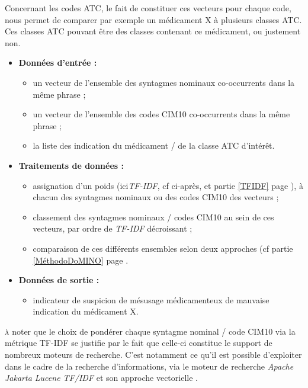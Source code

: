 \documentclass[a4paper, 12pt, openany, oneside, abstract=on]{article} %
\begin{document}
Concernant les codes ATC, le fait de constituer ces vecteurs pour chaque code, nous permet de comparer par exemple un médicament X à plusieurs classes ATC. Ces classes ATC pouvant être des classes contenant ce médicament, ou justement non.

\begin{itemize}
\item\textbf{Données d'entrée :}
        \begin{itemize}
            \item un vecteur de l'ensemble des syntagmes nominaux co-occurrents dans la même phrase ;
            \item un vecteur de l'ensemble des codes CIM10 co-occurrents dans la même phrase ;
            \item la liste des indication du médicament / de la classe ATC d'intérêt.
        \end{itemize}
\item\textbf{Traitements de données :}
        \begin{itemize}
            \item assignation d'un poids (ici\emph{TF-IDF}, cf ci-après, et partie \ref{TFIDF} page \pageref{TFIDF}), à chacun des syntagmes nominaux ou des codes CIM10 des vecteurs ;
            \item classement des syntagmes nominaux / codes CIM10 au sein de ces vecteurs, par ordre de \emph{TF-IDF} décroissant ;
            \item comparaison de ces différents ensembles selon deux approches (cf partie \ref{MéthodoDoMINO} page \pageref{MéthodoDoMINO}.
        \end{itemize}
\item\textbf{Données de sortie :}
        \begin{itemize}
            \item indicateur de suspicion de mésusage médicamenteux de mauvaise indication du médicament X.
        \end{itemize}
\end{itemize}

\textsc{à} noter que le choix de pondérer chaque syntagme nominal / code CIM10 via la métrique TF-IDF se justifie par le fait que celle-ci constitue le support de nombreux moteurs de recherche. C'est notamment ce qu'il est possible d'exploiter dans le cadre de la recherche d'informations, via le moteur de recherche \emph{Apache Jakarta Lucene TF/IDF} et son approche vectorielle \cite{Carpenter2004}.
\end{document}
